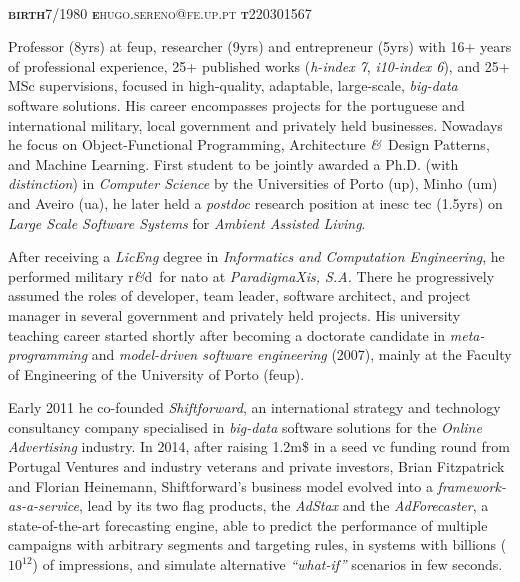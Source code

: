\documentclass[9pt, a4paper, pstricks]{article}
\newcommand{\amper}{{\fontspec[Scale=.95]{Hoefler Text}\selectfont\itshape\&}}
\newcommand{\years}[1]{\marginnote{\small #1}}
\newcommand{\marginimage}{
}
\newcommand{\acr}[1]{{\sc #1}}
\newcommand{\rnd}{{\sc r\amper d}~}
\begin{document}

{\huge\sc{}}\\
{\small {\scshape  {\bfseries birth}\hspace{2mm}7/1980 \hspace{8mm} {\bfseries e}\hspace{2mm}hugo.sereno@fe.up.pt \hspace{8mm} {\bfseries t}\hspace{2mm}220301567}}\\

\years{\vspace{-4mm}\\\hspace*{-10mm}\texttt{[image: qrcode.eps]}}\marginimage{\small Professor (8yrs) at {\sc feup}, researcher (9yrs) and entrepreneur (5yrs) with 16+ years of professional experience, 25+ published works (\emph{h-index 7}, \emph{i10-index 6}), and 25+ MSc supervisions, focused in high-quality, adaptable, large-scale, \emph{big-data} software solutions. His career encompasses projects for the portuguese and international military, local government and privately held businesses. Nowadays he focus on Object-Functional Programming, Architecture \amper~Design Patterns, and Machine Learning. First student to be jointly awarded a Ph.D. (with \emph{distinction}) in \emph{Computer Science} by the Universities of Porto {\sc (up)}, Minho {\sc (um)} and Aveiro {\sc (ua)}, he later held a \emph{postdoc} research position at \acr{inesc tec} (1.5yrs) on \emph{Large Scale Software Systems} for \emph{Ambient Assisted Living}.

\vspace{1mm}After receiving a \emph{LicEng} degree in \emph{Informatics and Computation Engineering}, he performed military \rnd for \acr{nato} at \emph{ParadigmaXis, S.A.} There he progressively assumed the roles of developer, team leader, software architect, and project manager in several government and privately held projects. His university teaching career started shortly after becoming a doctorate candidate in \emph{meta-programming} and \emph{model-driven software engineering} (2007), mainly at the Faculty of Engineering of the University of Porto (\acr{feup}).

\vspace{1mm}Early 2011 he co-founded \emph{Shiftforward}, an international strategy and technology consultancy company specialised in \emph{big-data} software solutions for the \emph{Online Advertising} industry. In 2014, after raising 1.2{\sc m}\$ in a seed {\sc vc} funding round from Portugal Ventures and industry veterans and private investors, Brian Fitzpatrick and Florian Heinemann, Shiftforward's business model evolved into a \emph{framework-as-a-service}, lead by its two flag products, the \emph{AdStax} and the \emph{AdForecaster}, a state-of-the-art forecasting engine, able to predict the performance of multiple campaigns with arbitrary segments and targeting rules, in systems with billions ($10^{12}$) of impressions, and simulate alternative \emph{``what-if''} scenarios in few seconds.}
\end{document}

